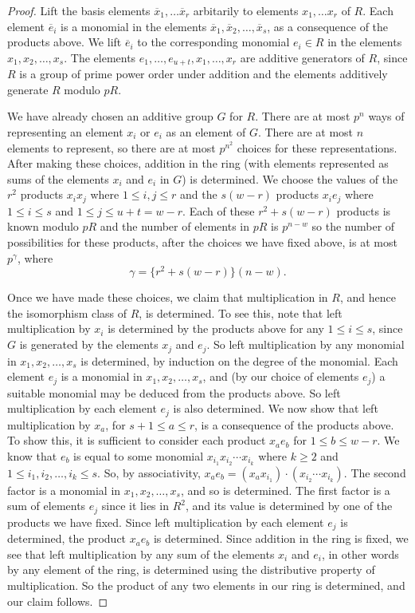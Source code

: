 \documentclass[12pt]{article}
\begin{document}
\begin{proof}
Lift the basis elements $\overline{x}_{1}, \ldots \overline{x}_{r}$ arbitarily to elements $x_{1}, \ldots x_{r}$ of $R$. Each element $\overline{e}_i$ is a monomial in the elements $\overline{x}_{1},\overline{x}_{2},\ldots,\overline{x}_{s}$, as a consequence of the products above. We lift $\overline{e}_i$ to the corresponding monomial $e_i\in R$ in the elements $x_1,x_2,\ldots,x_s$. The elements $e_{1}, \ldots, e_{u+t}, x_{1}, \ldots, x_{r}$ are additive generators of $R$, since $R$ is a group of prime power order under addition and the elements additively generate $R$ modulo $pR$.

We have already chosen an additive group $G$ for $R$. There are at most $p^n$ ways of representing an element $x_i$ or $e_i$ as an element of $G$. There are at most $n$ elements to represent, so there are at most $p^{n^2}$ choices for these representations. After making these choices, addition in the ring (with elements represented as sums of the elements $x_i$ and $e_i$ in $G$) is determined. We choose the values of the $r^{2}$ products $x_{i}x_{j}$ where $1\leq i,j\leq r$ and the $s(w - r)$ products $x_{i}e_{j}$ where $1\leq i\leq s$ and $1\leq j\leq u+t=w-r$. Each of these $r^{2} + s(w - r)$ products is known modulo $pR$ and the number of elements in $pR$ is $p^{n - w}$ so the number of possibilities for these products, after the choices we have fixed above, is at most $p^{\gamma}$, where  
\[
\gamma = \{r^{2} + s(w - r)\}(n - w).
\]

Once we have made these choices, we claim that multiplication in $R$, and hence the isomorphism class of $R$, is determined. To see this, note that left multiplication by $x_i$ is determined by the products above for any $1\leq i\leq s$, since $G$ is generated by the elements $x_j$ and $e_j$. So left multiplication by any monomial in $x_1,x_2,\ldots,x_s$ is determined, by induction on the degree of the monomial. Each element $e_j$ is a monomial in $x_1,x_2,\ldots,x_s$, and (by our choice of elements $e_j$) a suitable monomial may be deduced from the products above. So left multiplication by each element $e_j$ is also determined.  We now show that left multiplication by $x_a$, for $s+1\leq a\leq  r$, is a consequence of the products above. To show this, it is sufficient to consider each product $x_a e_b$ for $1\leq b\leq w-r$. We know that $e_b$ is equal to some monomial $x_{i_1}x_{i_2}\cdots x_{i_k}$ where $k\geq 2$ and $1\leq i_1,i_2,\ldots, i_k\leq s$. So, by associativity, $x_a e_b=(x_a x_{i_1})\cdot (x_{i_2}\cdots x_{i_k})$. The second factor is a monomial in $x_1,x_2,\ldots,x_s$, and so is determined. The first factor is a sum of elements $e_j$ since it lies in $R^2$, and its value is determined by one of the products we have fixed. Since left multiplication by each element $e_j$ is determined, the product $x_a e_b$ is determined. Since addition in the ring is fixed, we see that left multiplication by any sum of the elements $x_i$ and $e_i$, in other words by any element of the ring, is determined using the distributive property of multiplication. So the product of any two elements in our ring is determined, and our claim follows.


\end{proof}
\end{document}

